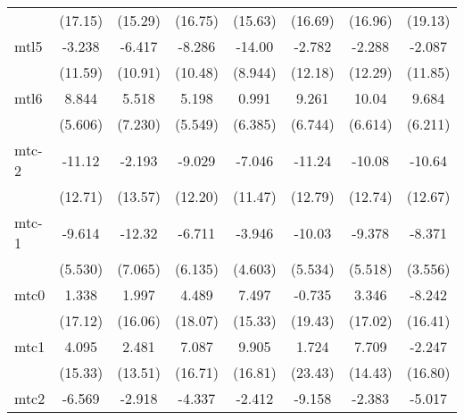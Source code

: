 \documentclass{article}
\begin{document}
{\begin{longtable}{l*{7}{c}}
                &  (17.15)         &  (15.29)         &  (16.75)         &  (15.63)         &  (16.69)         &  (16.96)         &  (19.13)         \\
mtl5            &   -3.238         &   -6.417         &   -8.286         &   -14.00         &   -2.782         &   -2.288         &   -2.087         \\
                &  (11.59)         &  (10.91)         &  (10.48)         &  (8.944)         &  (12.18)         &  (12.29)         &  (11.85)         \\
mtl6            &    8.844         &    5.518         &    5.198         &    0.991         &    9.261         &    10.04         &    9.684         \\
                &  (5.606)         &  (7.230)         &  (5.549)         &  (6.385)         &  (6.744)         &  (6.614)         &  (6.211)         \\
mtc-2           &   -11.12         &   -2.193         &   -9.029         &   -7.046         &   -11.24         &   -10.08         &   -10.64         \\
                &  (12.71)         &  (13.57)         &  (12.20)         &  (11.47)         &  (12.79)         &  (12.74)         &  (12.67)         \\
mtc-1           &   -9.614         &   -12.32         &   -6.711         &   -3.946         &   -10.03         &   -9.378         &   -8.371         \\
                &  (5.530)         &  (7.065)         &  (6.135)         &  (4.603)         &  (5.534)         &  (5.518)         &  (3.556)         \\
mtc0            &    1.338         &    1.997         &    4.489         &    7.497         &   -0.735         &    3.346         &   -8.242         \\
                &  (17.12)         &  (16.06)         &  (18.07)         &  (15.33)         &  (19.43)         &  (17.02)         &  (16.41)         \\
mtc1            &    4.095         &    2.481         &    7.087         &    9.905         &    1.724         &    7.709         &   -2.247         \\
                &  (15.33)         &  (13.51)         &  (16.71)         &  (16.81)         &  (23.43)         &  (14.43)         &  (16.80)         \\
mtc2            &   -6.569         &   -2.918         &   -4.337         &   -2.412         &   -9.158         &   -2.383         &   -5.017         \\

\end{longtable}}
\end{document}
